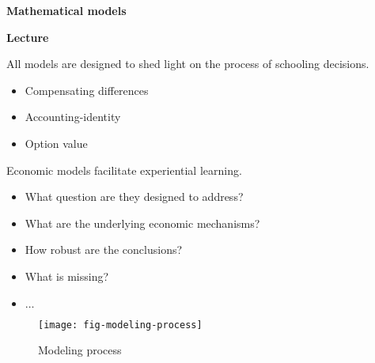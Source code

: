 \begin{frame}\begin{center}
		\LARGE\textbf{Mathematical models}
\end{center}\end{frame}
\begin{frame}\textbf{Lecture}\vspace{0.3cm}

All models are designed to shed light on the process of schooling decisions.\\\vspace{0.3cm}

\begin{itemize}\setlength\itemsep{1em}
\item Compensating differences
\item Accounting-identity
\item Option value
\end{itemize}

\end{frame}
\begin{frame}
Economic models facilitate experiential learning.\vspace{0.3cm}
\begin{itemize}\setlength\itemsep{1em}
\item What question are they designed to address?
\item What are the underlying economic mechanisms?
\item How robust are the conclusions?
\item What is missing?
\item $\hdots$
\end{itemize}

\end{frame}
\begin{frame}
	\begin{figure}[htp]\centering
		\caption{Modeling process}\scalebox{0.45}
		{\texttt{[image: fig-modeling-process]}}
	\end{figure}
\end{frame}
